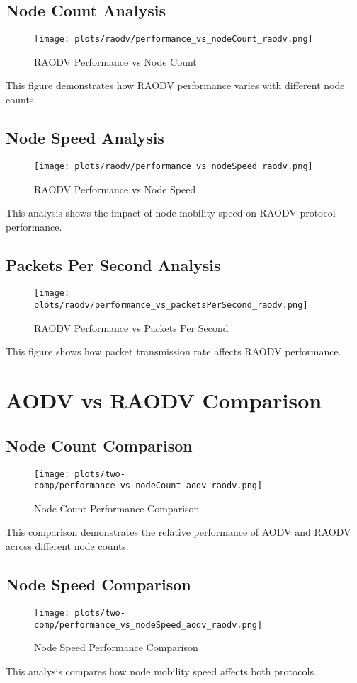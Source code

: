 \documentclass{article}
\begin{document}
\subsection{Node Count Analysis}
\begin{figure}[H]
\centering
\texttt{[image: plots/raodv/performance\_vs\_nodeCount\_raodv.png]}
\caption{RAODV Performance vs Node Count}
\end{figure}
This figure demonstrates how RAODV performance varies with different node counts.
\newpage
\subsection{Node Speed Analysis}
\begin{figure}[H]
\centering
\texttt{[image: plots/raodv/performance\_vs\_nodeSpeed\_raodv.png]}
\caption{RAODV Performance vs Node Speed}
\end{figure}
This analysis shows the impact of node mobility speed on RAODV protocol performance.
\newpage
\subsection{Packets Per Second Analysis}
\begin{figure}[H]
\centering
\texttt{[image: plots/raodv/performance\_vs\_packetsPerSecond\_raodv.png]}
\caption{RAODV Performance vs Packets Per Second}
\end{figure}
This figure shows how packet transmission rate affects RAODV performance.
\newpage
\section{AODV vs RAODV Comparison}
\subsection{Node Count Comparison}
\begin{figure}[H]
\centering
\texttt{[image: plots/two-comp/performance\_vs\_nodeCount\_aodv\_raodv.png]}
\caption{Node Count Performance Comparison}
\end{figure}
This comparison demonstrates the relative performance of AODV and RAODV across different node counts.
\newpage
\subsection{Node Speed Comparison}
\begin{figure}[H]
\centering
\texttt{[image: plots/two-comp/performance\_vs\_nodeSpeed\_aodv\_raodv.png]}
\caption{Node Speed Performance Comparison}
\end{figure}
This analysis compares how node mobility speed affects both protocols.
\newpage
\end{document}
